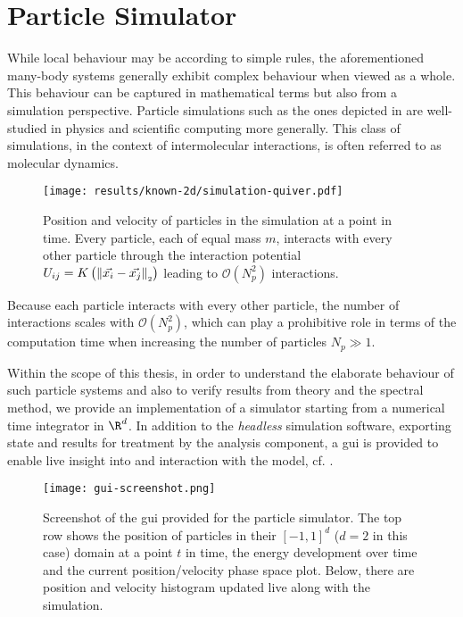 \chapter{Particle Simulator}
\label{chap:particle-simulator}

While local behaviour may be according to simple rules, the aforementioned many-body systems generally exhibit complex behaviour when viewed as a whole.
This behaviour can be captured in mathematical terms but also from a simulation perspective.
Particle simulations such as the ones depicted in  are well-studied in physics and scientific computing more generally.
This class of simulations, in the context of intermolecular interactions, is often referred to as molecular dynamics.

\begin{figure}[H]
  \centering
  \texttt{[image: results/known-2d/simulation-quiver.pdf]}
  \caption[Quiver plot of 120 particles in 2D interacting through $K_{\alpha,\beta}$]{Position and velocity of particles in the simulation at a point in time. Every particle, each of equal mass $m$, interacts with every other particle through the interaction potential $U_{ij} = K\left(\left\lVert\vec{x_i} - \vec{x_j}\right\rVert_{\scriptscriptstyle 2}\right)$ leading to $\mathcal{O}(N_p^2)$ interactions.}
  \label{fig:simulation-quiver}
\end{figure}

Because each particle interacts with every other particle, the number of interactions scales with $\mathcal{O}(N_p^2)$,
which can play a prohibitive role in terms of the computation time when increasing the number of particles $N_p \gg 1$.

Within the scope of this thesis, in order to understand the elaborate behaviour of such particle systems and also to verify results from theory and the spectral method, we provide an implementation of a simulator starting from a numerical time integrator in $\R^d$.
In addition to the \textit{headless} simulation software, exporting state and results for treatment by the analysis component, a \gls{gui} is provided to enable live insight into and interaction with the model, cf. .

\begin{figure}[H]
  \centering
  \texttt{[image: gui-screenshot.png]}
  \caption[Graphical User Interface of the Simulator]{Screenshot of the \gls{gui} provided for the particle simulator. The top row shows the position of particles in their $[-1, 1]^d$ ($d = 2$ in this case) domain at a point $t$ in time, the energy development over time and the current position/velocity phase space plot. Below, there are position and velocity histogram updated live along with the simulation.}
  \label{fig:gui-screenshot}
\end{figure}

